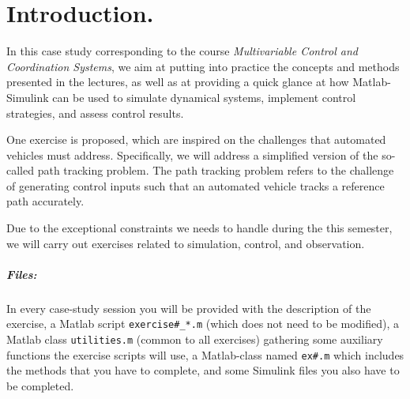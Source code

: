 \setcounter{chapter}{-1}
\chapter*{Introduction.}
%
	In this case study corresponding to the course \emph{Multivariable Control and Coordination Systems}, we aim at putting into practice the concepts and methods presented in the lectures, as well as at providing a quick glance at how Matlab-Simulink can be used to simulate dynamical systems, implement control strategies, and assess control results.
	\par
	One exercise is proposed, which are inspired on the challenges that automated vehicles must address.
	Specifically, we will address a simplified version of the so-called path tracking problem. 
	The path tracking problem refers to the challenge of generating control inputs such that an automated vehicle tracks a reference path accurately.
	\par
	Due to the exceptional constraints we needs to handle during the this semester, we will carry out exercises related to simulation, control, and observation. 

	\paragraph{Files:}
	In every case-study session you will be provided with the description of the exercise, a Matlab script \texttt{exercise\#\_*.m} (which does not need to be modified), a Matlab class \texttt{utilities.m} (common to all exercises) gathering some auxiliary functions the exercise scripts will use, a Matlab-class named \texttt{ex\#.m} which includes the methods that you have to complete, and some Simulink files you also have to be completed.\par
